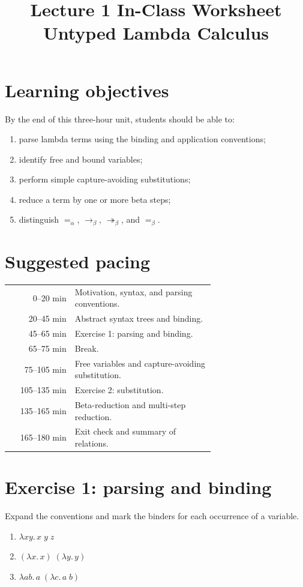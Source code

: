 \documentclass[11pt]{article}
\title{Lecture 1 In-Class Worksheet\\Untyped Lambda Calculus}
\author{}
\date{}
\newcommand{\lam}[1]{\lambda #1.\,}
\newcommand{\reduce}{\twoheadrightarrow_\beta}
\newcommand{\onereduce}{\to_\beta}
\begin{document}
\maketitle

\section*{Learning objectives}
By the end of this three-hour unit, students should be able to:
\begin{enumerate}[nosep]
  \item parse lambda terms using the binding and application conventions;
  \item identify free and bound variables;
  \item perform simple capture-avoiding substitutions;
  \item reduce a term by one or more beta steps;
  \item distinguish $=_\alpha$, $\onereduce$, $\reduce$, and $=_\beta$.
\end{enumerate}

\section*{Suggested pacing}
\begin{center}
\begin{tabular}{r p{0.68\linewidth}}
0--20 min & Motivation, syntax, and parsing conventions.\\
20--45 min & Abstract syntax trees and binding.\\
45--65 min & Exercise 1: parsing and binding.\\
65--75 min & Break.\\
75--105 min & Free variables and capture-avoiding substitution.\\
105--135 min & Exercise 2: substitution.\\
135--165 min & Beta-reduction and multi-step reduction.\\
165--180 min & Exit check and summary of relations.\\
\end{tabular}
\end{center}

\section*{Exercise 1: parsing and binding}
Expand the conventions and mark the binders for each occurrence of a variable.
\begin{enumerate}
  \item $\lam{x y} x\;y\;z$
  \item $(\lam{x}x)\;(\lam{y}y)$
  \item $\lam{a b} a\;(\lam{c}a\;b)$
\end{enumerate}
\end{document}
